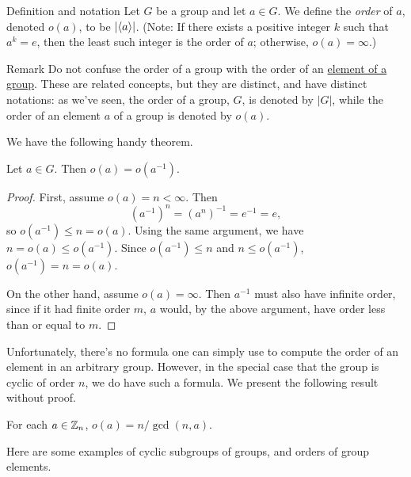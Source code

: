 \begin{df}{Definition and notation} Let $G$ be a group and let $a\in G$. We define the \textit{order} of $a$, denoted $o(a)$, to be $|\langle a\rangle|$. (Note: If there exists a positive integer $k$ such that $a^k=e$, then the least such integer is the order of $a$; otherwise, $o(a)=\infty$.)\end{df}

\begin{df}{Remark} Do not confuse the order of a group with the order
of an \underline{element of a group}. These are related concepts, but they are distinct, and have distinct
notations: as we've seen, the order of a group, $G$, is denoted by
$|G|$, while the order of an element $a$ of a group is denoted by
$o(a)$.\end{df}

We have the following handy theorem.

\begin{thm}\label{invord}
Let $a\in G$.  Then $o(a)=o(a^{-1})$.
\end{thm}

\begin{proof}
First, assume $o(a)=n<\infty$.  Then $$(a^{-1})^n=(a^n)^{-1}=e^{-1}=e,$$ so $o(a^{-1})\leq n=o(a)$.  Using the same argument, we have $n=o(a)\leq o(a^{-1})$. Since $o(a^{-1})\leq n$ and $n\leq o(a^{-1})$, $o(a^{-1})=n=o(a)$.

On the other hand, assume $o(a)= \infty$.  Then $a^{-1}$ must also have infinite order, since if it had finite order $m$, $a$ would, by the above argument, have order less than or equal to $m$.
\end{proof}

Unfortunately, there's no formula one can simply use to compute the order
of an element in an arbitrary group. However, in the special case
that the group is cyclic of order $n$, we do have such a formula. We
present the following result without proof.

\begin{thm}\label{znorders} For each $a\in \mathbb{Z}_n$, $o(a)=n/\gcd(n,a)$. \end{thm}

Here are some examples of cyclic subgroups of groups, and orders of group elements.


